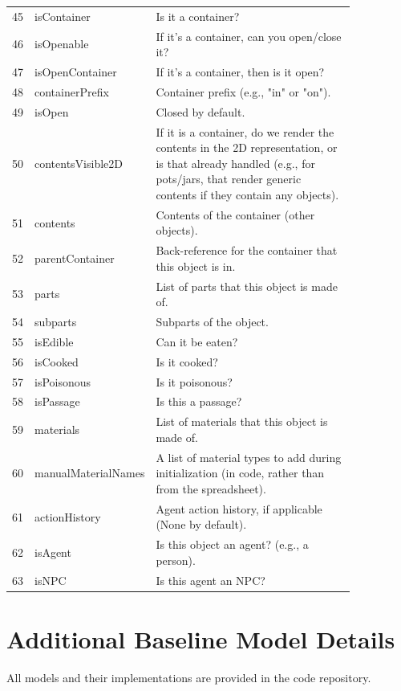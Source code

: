 \begin{table}[t!]
\begin{tabular}{cp{0.20\linewidth}p{0.65\linewidth}}
45 & isContainer & Is it a container? \\
46 & isOpenable & If it's a container, can you open/close it? \\
47 & isOpenContainer & If it's a container, then is it open? \\
48 & containerPrefix & Container prefix (e.g., "in" or "on"). \\
49 & isOpen & Closed by default. \\
50 & contentsVisible2D & If it is a container, do we render the contents in the 2D representation, or is that already handled (e.g., for pots/jars, that render generic contents if they contain any objects). \\
51 & contents & Contents of the container (other objects). \\
52 & parentContainer & Back-reference for the container that this object is in. \\
53 & parts & List of parts that this object is made of. \\
54 & subparts & Subparts of the object. \\
55 & isEdible & Can it be eaten? \\
56 & isCooked & Is it cooked? \\
57 & isPoisonous & Is it poisonous? \\
58 & isPassage & Is this a passage? \\
59 & materials & List of materials that this object is made of. \\
60 & manualMaterialNames & A list of material types to add during initialization (in code, rather than from the spreadsheet). \\
61 & actionHistory & Agent action history, if applicable (None by default). \\
62 & isAgent & Is this object an agent? (e.g., a person). \\
63 & isNPC & Is this agent an NPC? \\
\bottomrule
\end{tabular}
\end{table}



\clearpage
\section{Additional Baseline Model Details}
\label{sec:appendix-additional-model-details}

All models and their implementations are provided in the \env code repository. 

